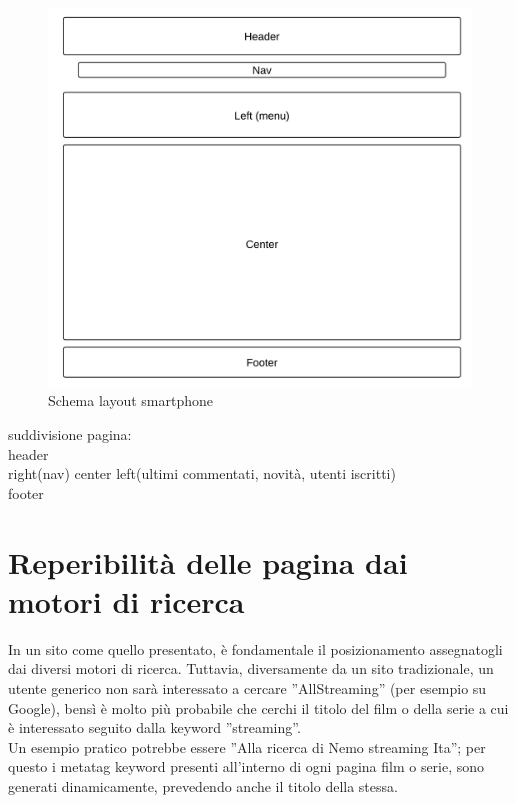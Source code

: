 \begin{itemize}
\begin{center}
\begin{figure}[H]
\centering
\includegraphics[scale=0.55]{images/smartLayout.png}
\caption{Schema layout smartphone}
\end{figure}
\end{center}

\end{itemize}



suddivisione pagina:\\
header\\
right(nav) center left(ultimi commentati, novità, utenti iscritti)\\
footer\\


\section{Reperibilità delle pagina dai motori di ricerca}

In un sito come quello presentato, è fondamentale il posizionamento assegnatogli dai diversi motori di ricerca. Tuttavia, diversamente da un sito tradizionale, un utente generico non sarà interessato a cercare ''AllStreaming'' (per esempio su Google), bensì è molto più probabile che cerchi il titolo del film o della serie a cui è interessato seguito dalla keyword ''streaming''.\\ 
Un esempio pratico potrebbe essere ''Alla ricerca di Nemo streaming Ita''; per questo i metatag keyword presenti all'interno di ogni pagina film o serie, sono generati dinamicamente, prevedendo anche il titolo della stessa.

